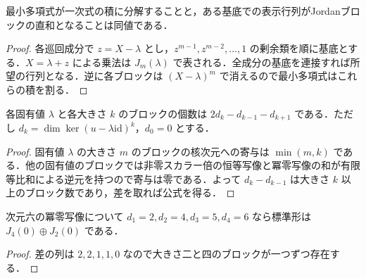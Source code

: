 \begin{prop}[Jordan標準形の存在]
最小多項式が一次式の積に分解することと，ある基底での表示行列がJordanブロックの直和となることは同値である．
\end{prop}
\begin{proof}
各巡回成分で $z=X-\lambda$ とし，$z^{m-1},z^{m-2},\ldots,1$ の剰余類を順に基底とする．$X=\lambda+z$ による乗法は $J_m(\lambda)$ で表される．全成分の基底を連接すれば所望の行列となる．逆に各ブロックは $(X-\lambda)^m$ で消えるので最小多項式はこれらの積を割る．
\end{proof}
\begin{prop}[Jordan標準形の一意性]
各固有値 $\lambda$ と各大きさ $k$ のブロックの個数は $2d_k-d_{k-1}-d_{k+1}$ である．ただし $d_k=\dim\ker(u-\lambda\mathrm{id})^k$，$d_0=0$ とする．
\end{prop}
\begin{proof}
固有値 $\lambda$ の大きさ $m$ のブロックの核次元への寄与は $\min(m,k)$ である．他の固有値のブロックでは非零スカラー倍の恒等写像と冪零写像の和が有限等比和による逆元を持つので寄与は零である．よって $d_k-d_{k-1}$ は大きさ $k$ 以上のブロック数であり，差を取れば公式を得る．
\end{proof}
\begin{example}[冪零行列のJordan標準形]
次元六の冪零写像について $d_1=2,d_2=4,d_3=5,d_4=6$ なら標準形は $J_4(0)\oplus J_2(0)$ である．
\end{example}
\begin{proof}
差の列は $2,2,1,1,0$ なので大きさ二と四のブロックが一つずつ存在する．
\end{proof}
